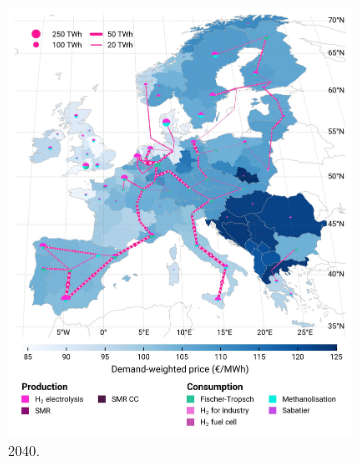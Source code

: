 \documentclass[preprint,12pt,sort&compress]{elsarticle}
\begin{document}
\begin{figure}[htbp]
\begin{subfigure}[t]{0.4\textwidth}
      \includegraphics[width=1\textwidth,trim=0cm 2.8cm 0cm 0cm, clip]{maps/pcipmi/base_s_adm___2040-balance_map_H2}
      \vspace{-0.5cm}
      \caption{ 2040.}
      \label{fig:PCI_lt_2040_h2}
  \end{subfigure}
  \hfill
  \begin{subfigure}[t]{0.4\textwidth}
      \vspace{0pt}

\end{subfigure}
\end{figure}
\end{document}
